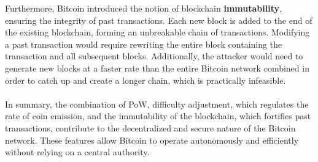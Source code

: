 \noindent Furthermore, Bitcoin introduced the notion of blockchain \textbf{immutability}, ensuring the integrity of past transactions. Each new block is added to the end of the existing blockchain, forming an unbreakable chain of transactions. Modifying a past transaction would require rewriting the entire block containing the transaction and all subsequent blocks. Additionally, the attacker would need to generate new blocks at a faster rate than the entire Bitcoin network combined in order to catch up and create a longer chain, which is practically infeasible.\\\\

\noindent In summary, the combination of PoW, difficulty adjustment, which regulates the rate of coin emission, and the immutability of the blockchain, which fortifies past transactions, contribute to the decentralized and secure nature of the Bitcoin network. These features allow Bitcoin to operate autonomously and efficiently without relying on a central authority.

